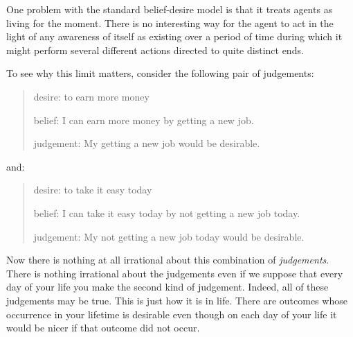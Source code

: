 \documentclass[12pt,\papersize]{extarticle}
\begin{document}
One problem with the standard belief-desire model is that it treats agents as living for the moment.
There is no interesting way for the agent to act in the light of any awareness of itself as existing over a period of time during which it might perform several different actions directed to quite distinct ends.

%

To see why this limit matters, consider the following pair of judgements:
%
\begin{quote}
desire: to earn more money

belief: I can earn more money by getting a new job.

judgement: My getting a new job would be desirable.
\end{quote}
and:
\begin{quote}
desire: to take it easy today

belief: I can take it easy today by not getting a new job today.

judgement: My not getting a new job today would be desirable.
\end{quote}
%
Now there is nothing at all irrational about this combination of \emph{judgements}.
There is nothing irrational about the judgements even if we suppose that every day of your life you make the second kind of judgement.
Indeed, all of these judgements may be true.
This is just how it is in life.
There are outcomes whose occurrence in your lifetime is desirable even though on each day of your life it would be nicer if that outcome did not occur.
\end{document}

